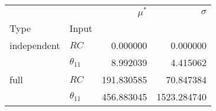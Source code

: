 \begin{tabular}{llrr}
\toprule
     &               &  $\mu^\ast$ &     $\sigma$ \\
Type & Input &             &              \\
\midrule
independent & $RC$ &    0.000000 &     0.000000 \\
     & $\theta_{11}$ &    8.992039 &     4.415062 \\
full & $RC$ &  191.830585 &    70.847384 \\
     & $\theta_{11}$ &  456.883045 &  1523.284740 \\
\bottomrule
\end{tabular}
